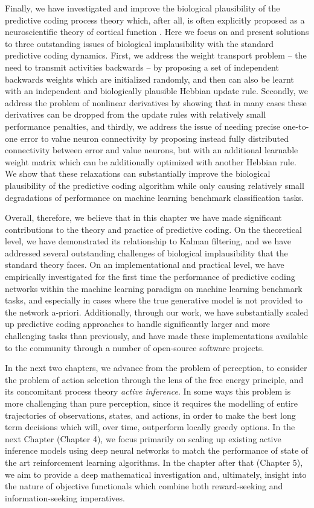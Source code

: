 Finally, we have investigated and improve the biological plausibility of the predictive coding process theory which, after all, is often explicitly proposed as a neuroscientific theory of cortical function \citep{friston2003learning,bastos2012canonical}. Here we focus on and present solutions to three outstanding issues of biological implausibility with the standard predictive coding dynamics. First, we address the weight transport problem -- the need to transmit activities backwards -- by proposing a set of independent backwards weights which are initialized randomly, and then can also be learnt with an independent and biologically plausible Hebbian update rule. Secondly, we address the problem of nonlinear derivatives by showing that in many cases these derivatives can be dropped from the update rules with relatively small performance penalties, and thirdly, we address the issue of needing precise one-to-one error to value neuron connectivity by proposing instead fully distributed connectivity between error and value neurons, but with an additional learnable weight matrix which can be additionally optimized with another Hebbian rule. We show that these relaxations can substantially improve the biological plausibility of the predictive coding algorithm while only causing relatively small degradations of performance on machine learning benchmark classification tasks.

Overall, therefore, we  believe that in this chapter we have made significant contributions to the theory and practice of predictive coding. On the theoretical level, we have demonstrated its relationship to Kalman filtering, and we have addressed several outstanding challenges of biological implausibility that the standard theory faces. On an implementational and practical level, we have empirically investigated for the first time the performance of predictive coding networks within the machine learning paradigm on machine learning benchmark tasks, and especially in cases where the true generative model is not provided to the network a-priori. Additionally, through our work, we have substantially scaled up predictive coding approaches to handle significantly larger and more challenging tasks than previously, and have made these implementations available to the community through a number of open-source software projects.

In the next two chapters, we advance from the problem of perception, to consider the problem of action selection through the lens of the free energy principle, and its concomitant process theory \emph{active inference}. In some ways this problem is more challenging than pure perception, since it requires the modelling of entire trajectories of observations, states, and actions, in order to make the best long term decisions which will, over time, outperform locally greedy options. In the next Chapter (Chapter 4), we focus primarily on scaling up existing active inference models using deep neural networks to match the performance of state of the art reinforcement learning algorithms. In the chapter after that (Chapter 5), we aim to provide a deep mathematical investigation and, ultimately, insight into the nature of objective functionals which combine both reward-seeking and information-seeking imperatives.